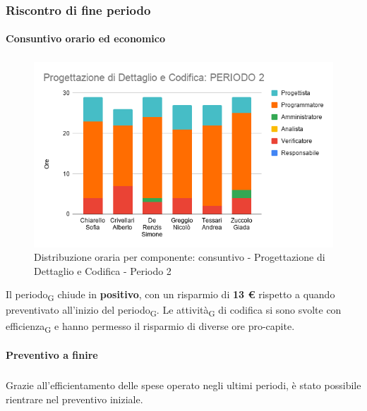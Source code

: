 \subsubsection{Riscontro di fine periodo}


\paragraph{Consuntivo orario ed economico}
\subparagraph*{}

\contabilitaTable{
	
}

\begin{figure}[H]
	\centering
	\includegraphics[scale=0.6]{res/images/charts/consuntivo/prog_dett_2.png}
	\caption{Distribuzione oraria per componente: consuntivo - Progettazione di Dettaglio e Codifica - Periodo 2}
\end{figure}


Il periodo\textsubscript{G} chiude in \textbf{positivo}, con un risparmio di \textbf{13 \euro} rispetto a quando preventivato all'inizio del periodo\textsubscript{G}. Le attività\textsubscript{G} di codifica si sono svolte con efficienza\textsubscript{G} e hanno permesso il risparmio di diverse ore pro-capite.


\paragraph{Preventivo a finire}
\subparagraph*{}

\pafTable{
	
}

Grazie all'efficientamento delle spese operato negli ultimi periodi, è stato possibile rientrare nel preventivo iniziale.



